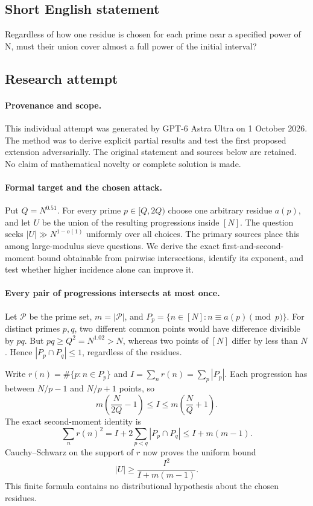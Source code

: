 \documentclass[11pt,a4paper]{article}
\begin{document}
\subsection{Short English statement}

Regardless of how one residue is chosen for each prime near a specified power of N, must their union cover almost a full power of the initial interval?

\subsection{Research attempt}

\paragraph{Provenance and scope.}
This individual attempt was generated by GPT-6 Astra Ultra on 1 October 2026. The method was to derive explicit partial results and test the first proposed extension adversarially. The original statement and sources below are retained. No claim of mathematical novelty or complete solution is made.

\paragraph{Formal target and the chosen attack.}
Put $Q=N^{0.51}$. For every prime $p\in[Q,2Q)$ choose one arbitrary residue $a(p)$, and let $U$ be the union of the resulting progressions inside $[N]$. The question seeks $|U|\gg N^{1-o(1)}$ uniformly over all choices. The primary sources place this among large-modulus sieve questions. We derive the exact first-and-second-moment bound obtainable from pairwise intersections, identify its exponent, and test whether higher incidence alone can improve it.

\paragraph{Every pair of progressions intersects at most once.}
Let $\mathcal P$ be the prime set, $m=|\mathcal P|$, and $P_p=\{n\in[N]:n\equiv a(p)\pmod p\}$. For distinct primes $p,q$, two different common points would have difference divisible by $pq$. But $pq\geq Q^2=N^{1.02}>N$, whereas two points of $[N]$ differ by less than $N$. Hence $|P_p\cap P_q|\leq1$, regardless of the residues.

Write $r(n)=\#\{p:n\in P_p\}$ and $I=\sum_nr(n)=\sum_p|P_p|$. Each progression has between $N/p-1$ and $N/p+1$ points, so
\[
 m\left(\frac{N}{2Q}-1\right)\leq I
 \leq m\left(\frac NQ+1\right).
\]
The exact second-moment identity is
\[
 \sum_nr(n)^2=I+2\sum_{p<q}|P_p\cap P_q|
 \leq I+m(m-1).
\]
Cauchy--Schwarz on the support of $r$ now proves the uniform bound
\[
 |U|\geq\frac{I^2}{I+m(m-1)}.
\]
This finite formula contains no distributional hypothesis about the chosen residues.
\end{document}
